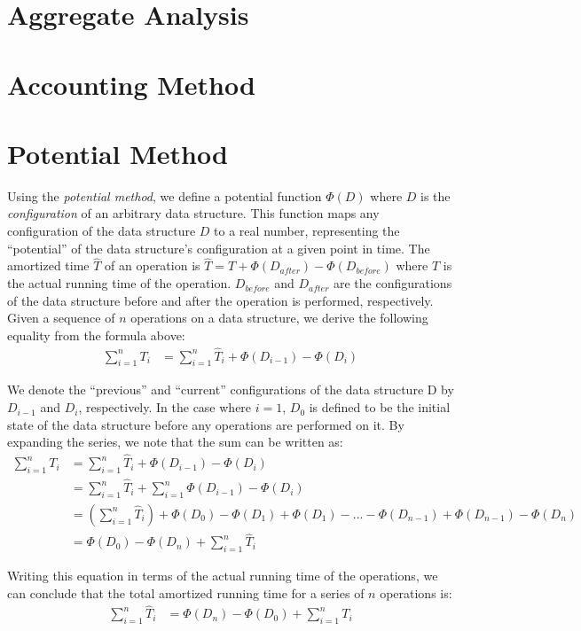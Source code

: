 \documentclass[12pt]{article}
\begin{document}
\section{Aggregate Analysis}


\section{Accounting Method}


\section{Potential Method}
Using the \emph{potential method}, we define a potential function $\Phi(D)$ where $D$ is the \emph{configuration} of an arbitrary data structure. This function maps any configuration of the data structure $D$ to a real number, representing the ``potential'' of the data structure's configuration at a given point in time. The amortized time $\hat{T}$ of an operation is $\hat{T} = T+\Phi(D_{after})-\Phi(D_{before})$ where $T$ is the actual running time of the operation. $D_{before}$ and $D_{after}$ are the configurations of the data structure before and after the operation is performed, respectively. \\

Given a sequence of $n$ operations on a data structure, we derive the following equality from the formula above:
\begin{align}
\sum_{i=1}^{n} T_i &= \sum_{i=1}^{n} \hat{T}_i + \Phi(D_{i-1}) - \Phi(D_{i})
\end{align}

We denote the ``previous'' and ``current'' configurations of the data structure D by $D_{i-1}$ and $D_{i}$, respectively. In the case where $i=1$, $D_0$ is defined to be the initial state of the data structure before any operations are performed on it. By expanding the series, we note that the sum can be written as:
\begin{align}
\sum_{i=1}^{n} T_i &= \sum_{i=1}^{n} \hat{T}_i + \Phi(D_{i-1}) - \Phi(D_{i}) \\
&= \sum_{i=1}^{n} \hat{T}_i + \sum_{i=1}^{n} \Phi(D_{i-1}) - \Phi(D_{i}) \\
&= \left( \sum_{i=1}^{n} \hat{T}_i \right) + \Phi(D_0) - \Phi(D_1) + \Phi(D_1) - ... - \Phi(D_{n-1}) + \Phi(D_{n-1}) - \Phi(D_n) \\
&= \Phi(D_0) - \Phi(D_n) + \sum_{i=1}^{n} \hat{T}_i
\end{align}

Writing this equation in terms of the actual running time of the operations, we can conclude that the total amortized running time for a series of $n$ operations is:
\begin{align}
\sum_{i=1}^{n} \hat{T}_{i} &= \Phi(D_n) - \Phi(D_0) + \sum_{i=1}^{n} T_{i}
\end{align}
\end{document}
